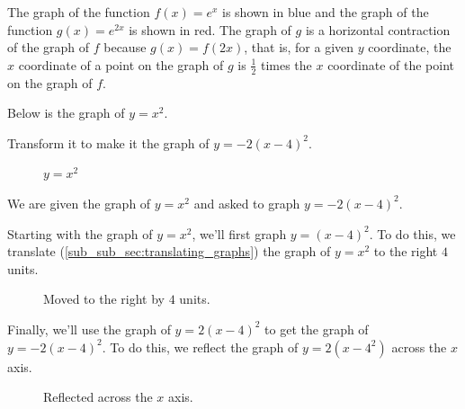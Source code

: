 \begin{example}
  \label{exm:stretching_and_shrinking}

  The graph of the function $f(x) = e^{x}$ is shown in blue and the graph of the
  function $g(x) = e^{2x}$ is shown in red. The graph of $g$ is a horizontal
  contraction of the graph of $f$ because $g(x) = f(2x)$, that is, for a given
  $y$ coordinate, the $x$ coordinate of a point on the graph of $g$ is
  $\frac{1}{2}$ times the $x$ coordinate of the point on the graph of $f$.
\end{example}

\begin{marginfigure}
  \centering
  \label{fig:stretching_and_shrinking}
\end{marginfigure}


\begin{example}
  \label{exm:all_put_together}

  Below is the graph of $y = x^{2}$.

  Transform it to make it the graph of $y = -2(x - 4)^{2}$.

  \begin{figure}[H]
    \centering
    \caption{$y = x^{2}$}
    \label{fig:images_starting_graph_png}
  \end{figure}

  We are given the graph of $y = x^{2}$ and asked to graph $y = -2(x - 4)^{2}$.

  Starting with the graph of $y = x^{2}$, we'll first graph $y = (x - 4)^{2}$.
  To do this, we translate (\ref{sub_sub_sec:translating_graphs}) the graph of
  $y = x^{2}$ to the right $4$ units.

  \begin{figure}[H]
    \centering
    \caption{Moved to the right by $4$ units.}
    \label{fig:images_right_graph_png}
  \end{figure}

  Finally, we'll use the graph of $y = 2(x - 4)^{2}$ to get the graph of $y =
  -2(x - 4)^{2}$. To do this, we reflect the graph of $y = 2(x - 4^{2})$ across
  the $x$ axis.

  \begin{figure}[H]
    \centering
    \caption{Reflected across the $x$ axis.}
    \label{fig:final_graph}
  \end{figure}
\end{example}

\newpage
